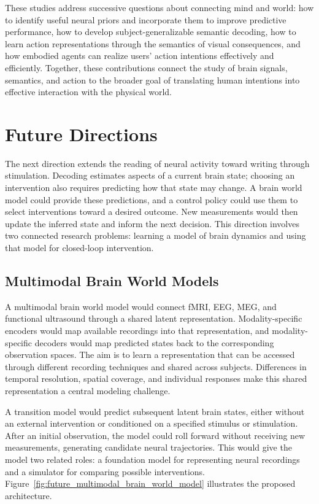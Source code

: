 These studies address successive questions about connecting mind and world: how to identify useful neural priors and incorporate them to improve predictive performance, how to develop subject-generalizable semantic decoding, how to learn action representations through the semantics of visual consequences, and how embodied agents can realize users' action intentions effectively and efficiently. Together, these contributions connect the study of brain signals, semantics, and action to the broader goal of translating human intentions into effective interaction with the physical world.

\section{Future Directions}
\label{sec:future_directions}

The next direction extends the reading of neural activity toward writing through stimulation. Decoding estimates aspects of a current brain state; choosing an intervention also requires predicting how that state may change. A brain world model could provide these predictions, and a control policy could use them to select interventions toward a desired outcome. New measurements would then update the inferred state and inform the next decision. This direction involves two connected research problems: learning a model of brain dynamics and using that model for closed-loop intervention.

\subsection{Multimodal Brain World Models}
\label{sec:future_multimodal_brain_models}

A multimodal brain world model would connect fMRI, EEG, MEG, and functional ultrasound through a shared latent representation. Modality-specific encoders would map available recordings into that representation, and modality-specific decoders would map predicted states back to the corresponding observation spaces. The aim is to learn a representation that can be accessed through different recording techniques and shared across subjects. Differences in temporal resolution, spatial coverage, and individual responses make this shared representation a central modeling challenge.

A transition model would predict subsequent latent brain states, either without an external intervention or conditioned on a specified stimulus or stimulation. After an initial observation, the model could roll forward without receiving new measurements, generating candidate neural trajectories. This would give the model two related roles: a foundation model for representing neural recordings and a simulator for comparing possible interventions. Figure~\ref{fig:future_multimodal_brain_world_model} illustrates the proposed architecture.

